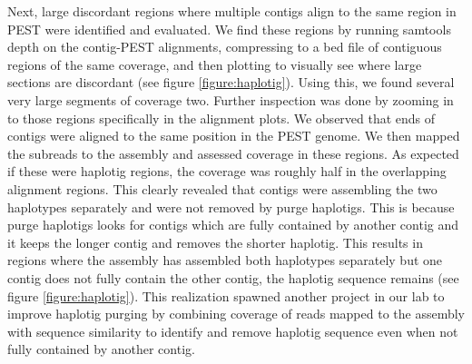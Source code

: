 \par{
Next, large discordant regions where multiple contigs align to the same region in PEST were identified and evaluated. We find these regions by running samtools depth on the contig-PEST alignments, compressing to a bed file of contiguous regions of the same coverage, and then plotting to visually see where large sections are discordant (see figure \ref{figure:haplotig}). Using this, we found several very large segments of coverage two. Further inspection was done by zooming in to those regions specifically in the alignment plots. We observed that ends of contigs were aligned to the same position in the PEST genome. We then mapped the subreads to the assembly and assessed coverage in these regions. As expected if these were haplotig regions, the coverage was roughly half in the overlapping alignment regions. This clearly revealed that contigs were assembling the two haplotypes separately and were not removed by purge haplotigs. This is because purge haplotigs looks for contigs which are fully contained by another contig and it keeps the longer contig and removes the shorter haplotig. This results in regions where the assembly has assembled both haplotypes separately but one contig does not fully contain the other contig, the haplotig sequence remains (see figure \ref{figure:haplotig}). This realization spawned another project in our lab to improve haplotig purging by combining coverage of reads mapped to the assembly with sequence similarity to identify and remove haplotig sequence even when not fully contained by another contig\cite{purgedups}.
}


